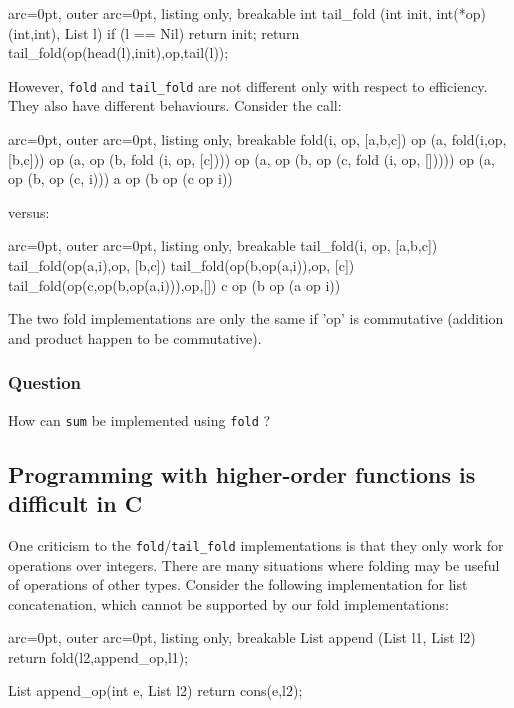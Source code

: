 \begin{tcblisting}{ arc=0pt, outer arc=0pt, listing only, breakable}
int tail_fold (int init, int(*op)(int,int), List l){
    if (l == Nil)
        return init;
    return tail_fold(op(head(l),init),op,tail(l));
}

\end{tcblisting}


However, \texttt{fold} and \texttt{tail\_fold} are not different only with respect to efficiency. They also have different behaviours. Consider the call: 


\begin{tcblisting}{ arc=0pt, outer arc=0pt, listing only, breakable}
fold(i, op, [a,b,c])
op (a, fold(i,op, [b,c]))
op (a, op (b, fold (i, op, [c])))
op (a, op (b, op (c, fold (i, op, []))))
op (a, op (b, op (c, i)))
a op (b op (c op i))

\end{tcblisting}


versus:


\begin{tcblisting}{ arc=0pt, outer arc=0pt, listing only, breakable}
tail_fold(i, op, [a,b,c])
tail_fold(op(a,i),op, [b,c])
tail_fold(op(b,op(a,i)),op, [c])
tail_fold(op(c,op(b,op(a,i))),op,[])
c op (b op (a op i)) 

\end{tcblisting}


The two fold implementations are only the same if 'op' is commutative (addition and product happen to be commutative).

\subsubsection*{ Question }
How can \texttt{sum} be implemented using \texttt{fold} ?

\subsection*{ Programming with higher-order functions is difficult in C }

One criticism to the \texttt{fold}/\texttt{tail\_fold} implementations is that they only work for operations over integers. 
There are many situations where folding may be useful of operations of other types. Consider the following implementation for list concatenation, which cannot be supported by our fold implementations:


\begin{tcblisting}{ arc=0pt, outer arc=0pt, listing only, breakable}
List append (List l1, List l2) {return fold(l2,append_op,l1);}

List append_op(int e, List l2) {return cons(e,l2);}

\end{tcblisting}


